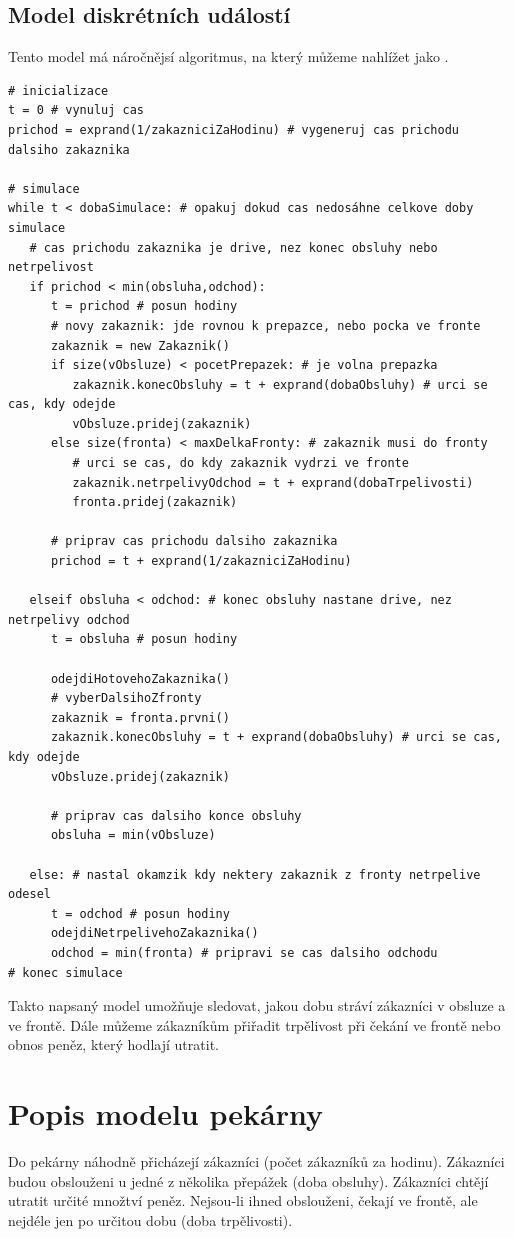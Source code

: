 \documentclass[a4paper,12pt]{article}
\begin{document}
\subsection{Model diskrétních událostí}
Tento model má náročnějsí algoritmus, na který můžeme nahlížet jako . 
\footnotesize
\begin{verbatim}
# inicializace
t = 0 # vynuluj cas
prichod = exprand(1/zakazniciZaHodinu) # vygeneruj cas prichodu dalsiho zakaznika

# simulace
while t < dobaSimulace: # opakuj dokud cas nedosáhne celkove doby simulace
   # cas prichodu zakaznika je drive, nez konec obsluhy nebo netrpelivost
   if prichod < min(obsluha,odchod): 
      t = prichod # posun hodiny
      # novy zakaznik: jde rovnou k prepazce, nebo pocka ve fronte
      zakaznik = new Zakaznik()
      if size(vObsluze) < pocetPrepazek: # je volna prepazka
         zakaznik.konecObsluhy = t + exprand(dobaObsluhy) # urci se cas, kdy odejde
         vObsluze.pridej(zakaznik)
      else size(fronta) < maxDelkaFronty: # zakaznik musi do fronty 
         # urci se cas, do kdy zakaznik vydrzi ve fronte
         zakaznik.netrpelivyOdchod = t + exprand(dobaTrpelivosti) 
         fronta.pridej(zakaznik)

      # priprav cas prichodu dalsiho zakaznika
      prichod = t + exprand(1/zakazniciZaHodinu)

   elseif obsluha < odchod: # konec obsluhy nastane drive, nez netrpelivy odchod
      t = obsluha # posun hodiny

      odejdiHotovehoZakaznika()
      # vyberDalsihoZfronty
      zakaznik = fronta.prvni()
      zakaznik.konecObsluhy = t + exprand(dobaObsluhy) # urci se cas, kdy odejde
      vObsluze.pridej(zakaznik)

      # priprav cas dalsiho konce obsluhy
      obsluha = min(vObsluze) 

   else: # nastal okamzik kdy nektery zakaznik z fronty netrpelive odesel
      t = odchod # posun hodiny
      odejdiNetrpelivehoZakaznika()
      odchod = min(fronta) # pripravi se cas dalsiho odchodu
# konec simulace
\end{verbatim}
\normalsize

Takto napsaný model umožňuje sledovat, jakou dobu stráví zákazníci v obsluze a ve frontě. 
Dále můžeme zákazníkům přiřadit trpělivost při čekání ve frontě nebo obnos peněz, který hodlají 
utratit. 

\section{Popis modelu pekárny}
Do pekárny náhodně přicházejí zákazníci (počet zákazníků za hodinu). Zákazníci budou obslouženi 
u jedné z několika přepážek (doba obsluhy). Zákazníci chtějí utratit určité množtví peněz. Nejsou-li 
ihned obslouženi, čekají ve frontě, ale nejdéle jen po určitou dobu (doba trpělivosti). 
\end{document}
